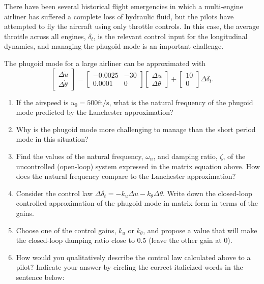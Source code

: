 \begin{question}
    There have been several historical flight emergencies in which a multi-engine airliner has suffered a complete loss of hydraulic fluid, but the pilots have attempted to fly the aircraft using only throttle controls. In this case, the average throttle across all engines, $\delta_t$, is the relevant control input for the longitudinal dynamics, and managing the phugoid mode is an important challenge.

    The phugoid mode for a large airliner can be approximated with
    $$
    \begin{bmatrix}
        \Delta \dot{u} \\
        \Delta \dot{\theta}
    \end{bmatrix}
    = 
    \begin{bmatrix}
        -0.0025 & -30 \\
        0.0001 & 0
    \end{bmatrix}
    \begin{bmatrix}
        \Delta u \\
        \Delta \theta
    \end{bmatrix}
    +
    \begin{bmatrix}
        10 \\
        0
    \end{bmatrix}
    \Delta \delta_t \text{.}
    $$
    
    \begin{enumerate}[label=(\alph*)]
        \item If the airspeed is $u_0 = 500\text{ft/s}$, what is the natural frequency of the phugoid mode predicted by the Lanchester approximation?
        \item Why is the phugoid mode more challenging to manage than the short period mode in this situation?
        \item Find the values of the natural frequency, $\omega_n$, and damping ratio, $\zeta$, of the uncontrolled (open-loop) system expressed in the matrix equation above. How does the natural frequency compare to the Lanchester approximation?
        \item Consider the control law $\Delta \delta_t = -k_u \Delta u - k_\theta \Delta \theta$. Write down the closed-loop controlled approximation of the phugoid mode in matrix form in terms of the gains.
        \item Choose one of the control gains, $k_u$ or $k_\theta$, and propose a value that will make the closed-loop damping ratio close to 0.5 (leave the other gain at 0).
        \item How would you qualitatively describe the control law calculated above to a pilot? Indicate your answer by circling the correct italicized words in the sentence below:
    
    \end{enumerate}
\end{question}